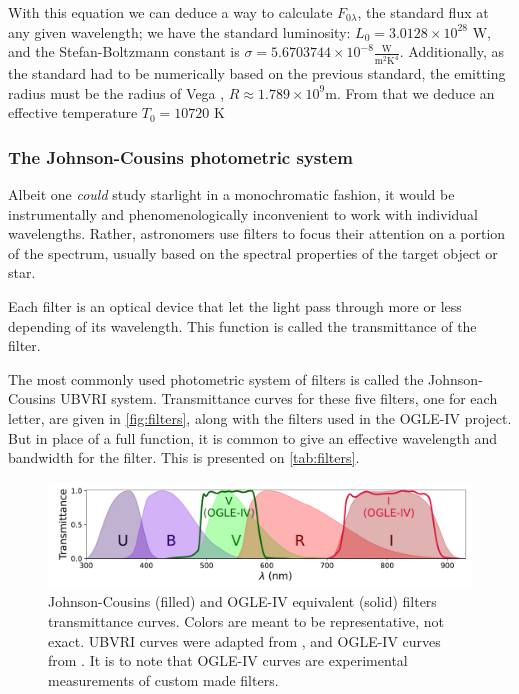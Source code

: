 	With this equation we can deduce a way to calculate $F_{0\lambda}$, the standard flux at any given wavelength; 
	we have the standard luminosity: $L_0=3.0128\times10^{28}\text{ W}$, 
	and the Stefan-Boltzmann constant is $\sigma=5.6703744\times10^{-8}\frac{\text{W}}{\text{m}^2\text{K}^4}$. 
	Additionally, as the standard had to be numerically based on the previous standard, the emitting radius must be the radius of Vega \citep{Yoon2010}, $R\approx 1.789 \times 10^9 \text{m}$.
	From that we deduce an effective temperature $T_0 = 10720 \text{ K}$
	
	\subsubsection{The Johnson-Cousins photometric system}
	
	Albeit one \textit{could} study starlight in a monochromatic fashion, 
	it would be instrumentally and phenomenologically inconvenient to work with individual wavelengths.
	Rather, astronomers use filters to focus their attention on a portion of the spectrum,
	usually based on the spectral properties of the target object or star.
	
	Each filter is an optical device that let the light pass through more or less depending of its wavelength.
	This function is called the transmittance of the filter. 
	
	The most commonly used photometric system of filters is called the Johnson-Cousins UBVRI system. 
	Transmittance curves for these five filters, one for each letter, are given in \autoref{fig:filters},
	along with the filters used in the OGLE-IV project. 
	But in place of a full function, it is common to give an effective wavelength and bandwidth for the filter. 
	This is presented on \autoref{tab:filters}.
	
	\begin{figure}[H]
		\centering
		\includegraphics[width=\textwidth]{img/filters.pdf}
		\caption[Johnson-Cousins and OGLE-IV photometric systems]{
			Johnson-Cousins (filled) and OGLE-IV equivalent (solid) filters transmittance curves. 
			Colors are meant to be representative, not exact. UBVRI curves were adapted from \cite{Bessell2005}, and OGLE-IV curves from \cite{OGLE2015}. 
			It is to note that OGLE-IV curves are experimental measurements of custom made filters.
		}
		\label{fig:filters}
	\end{figure}
	
